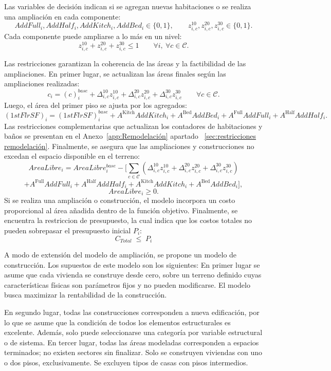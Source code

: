 Las variables de decisión indican si se agregan nuevas habitaciones o se realiza una ampliación en cada componente:
\[
AddFull_i, AddHalf_i, AddKitch_i, AddBed_i \in \{0,1\}, \qquad
z^{10}_{i,c}, z^{20}_{i,c}, z^{30}_{i,c} \in \{0,1\}.
\]
Cada componente puede ampliarse a lo más en un nivel:
\[
z^{10}_{i,c} + z^{20}_{i,c} + z^{30}_{i,c} \le 1 \qquad \forall i,\ \forall c \in \mathcal{C}.
\]

Las restricciones garantizan la coherencia de las áreas y la factibilidad de las ampliaciones. En primer lugar, se actualizan las áreas finales según las ampliaciones realizadas:
\[
c_i = (c)_i^{base} + \Delta^{10}_{i,c}z^{10}_{i,c} + \Delta^{20}_{i,c}z^{20}_{i,c} + \Delta^{30}_{i,c}z^{30}_{i,c} \qquad \forall c \in \mathcal{C}.
\]
Luego, el área del primer piso se ajusta por los agregados:
\[
(1stFlrSF)_i = (1stFlrSF)_i^{base} + A^{\text{Kitch}}AddKitch_i + A^{\text{Bed}}AddBed_i + A^{\text{Full}}AddFull_i + A^{\text{Half}}AddHalf_i.
\]
Las restricciones complementarias que actualizan los contadores de habitaciones y baños se presentan en el Anexo~\ref{app:Remodelación} apartado ~\ref{sec:restricciones remodelación}. Finalmente, se asegura que las ampliaciones y construcciones no excedan el espacio disponible en el terreno:
\[
AreaLibre_i = AreaLibre_i^{base} - 
\Big[ \sum_{c\in\mathcal{C}} (\Delta^{10}_{i,c}z^{10}_{i,c} + \Delta^{20}_{i,c}z^{20}_{i,c} + \Delta^{30}_{i,c}z^{30}_{i,c})
\]
\[
+ A^{\text{Full}}AddFull_i + A^{\text{Half}}AddHalf_i + A^{\text{Kitch}}AddKitch_i + A^{\text{Bed}}AddBed_i \Big],
\]
\[
AreaLibre_i \ge 0.
\]
Si se realiza una ampliación o construcción, el modelo incorpora un costo proporcional al área añadida dentro de la función objetivo. Finalmente, se encuentra la restriccion de presupuesto, la cual indica que los costos totales no pueden sobrepasar el presupuesto inicial $P_i$:
\[
C_{Total} \;\le\; P_i
\]

A modo de extensión del modelo de ampliación, se propone un modelo de construcción. Los supuestos de este modelo son los siguientes: En primer lugar se asume que cada vivienda se construye desde cero, sobre un terreno definido cuyas características físicas son parámetros fijos y no pueden modificarse. El modelo busca maximizar la rentabilidad de la construcción. 

En segundo lugar, todas las construcciones corresponden a nueva edificación, por lo que se asume que la  condición de todos los elementos estructurales es excelente. Además, solo puede seleccionarse una categoría por variable estructural o de sistema. En tercer lugar, todas las áreas modeladas corresponden a espacios terminados; no existen sectores sin finalizar. Solo se construyen viviendas con uno o dos pisos, exclusivamente. Se excluyen tipos de casas con pisos intermedios.

